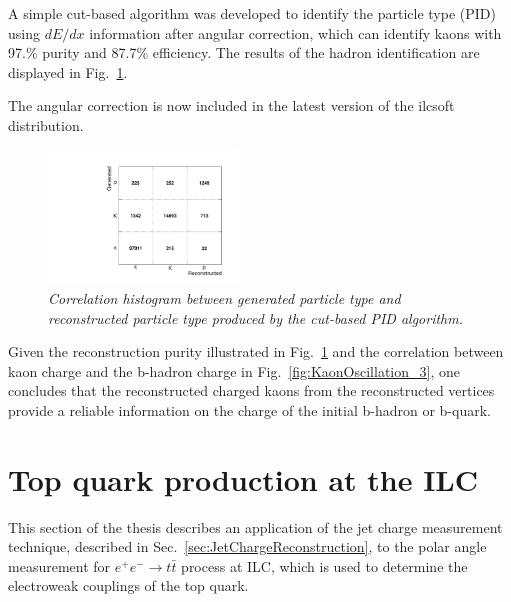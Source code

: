 A simple cut-based algorithm was developed to identify the particle type (PID) using $dE/dx$ information after angular correction, which can identify kaons with 97.\% purity and 87.7\% efficiency.
The results of the hadron identification are displayed in Fig.~\ref{fig:dEdxResults_3}.

The angular correction is now included in the latest version of the {\sc ilcsoft} distribution.

\begin{figure}
{\centering
    \includegraphics[width=0.45\textwidth]{ILD/plots/dedx-results.pdf}
    \caption{\sl Correlation histogram between generated particle type and reconstructed particle type produced by the cut-based PID algorithm.
    }
    \label{fig:dEdxResults_3}
  }
 
\end{figure}


Given the reconstruction purity illustrated in Fig.~\ref{fig:dEdxResults_3} and the correlation between kaon charge and the b-hadron charge in Fig.~\ref{fig:KaonOscillation_3}, one concludes that the reconstructed charged kaons from the reconstructed vertices provide a reliable information on the charge of the initial b-hadron or b-quark. 



\newpage
\section{Top quark production at the ILC}
This section of the thesis describes an application of the jet charge measurement technique, described in Sec.~\ref{sec:JetChargeReconstruction}, to the polar angle measurement for $e^+e^- \to t\bar{t}$ process at ILC, which is used to determine the electroweak couplings of the top quark.


